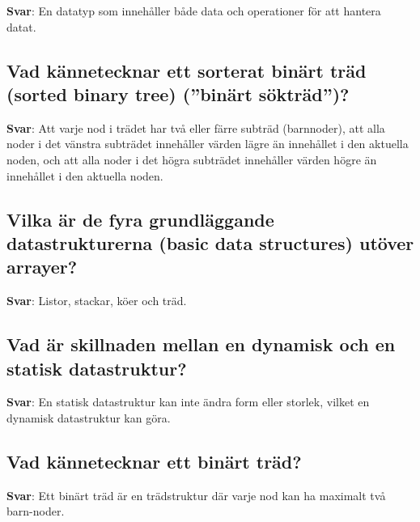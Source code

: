 \documentclass[a4paper,11pt,oneside]{article}
\begin{document}
\begin{sloppypar}
\label{q:251:sa:sv:True}

\textbf{Svar}: En datatyp som inneh\r{a}ller b\r{a}de data och operationer f\"or att hantera datat.



\subsection{Vad k\"annetecknar ett sorterat bin\"art tr\"ad (sorted binary tree) ({\textquotedblright}bin\"art s\"oktr\"ad{\textquotedblright})?}

\label{q:252:sa:sv:True}

\textbf{Svar}: Att varje nod i tr\"adet har tv\r{a} eller f\"arre subtr\"ad (barnnoder), att alla noder i det v\"anstra subtr\"adet inneh\r{a}ller v\"arden l\"agre \"an inneh\r{a}llet i den aktuella noden, och att alla noder i det h\"ogra subtr\"adet inneh\r{a}ller v\"arden h\"ogre \"an inneh\r{a}llet i den aktuella noden.



\subsection{Vilka \"ar de fyra grundl\"aggande datastrukturerna (basic data structures) ut\"over arrayer?}

\label{q:253:sa:sv:True}

\textbf{Svar}: Listor, stackar, k\"oer och tr\"ad.



\subsection{Vad \"ar skillnaden mellan en dynamisk och en statisk datastruktur?}

\label{q:254:sa:sv:True}

\textbf{Svar}: En statisk datastruktur kan inte \"andra form eller storlek, vilket en dynamisk datastruktur kan g\"ora.



\subsection{Vad k\"annetecknar ett bin\"art tr\"ad?}

\label{q:255:sa:sv:True}

\textbf{Svar}: Ett bin\"art tr\"ad \"ar en tr\"adstruktur d\"ar varje nod kan ha maximalt tv\r{a} barn-noder.




\end{sloppypar}
\end{document}
